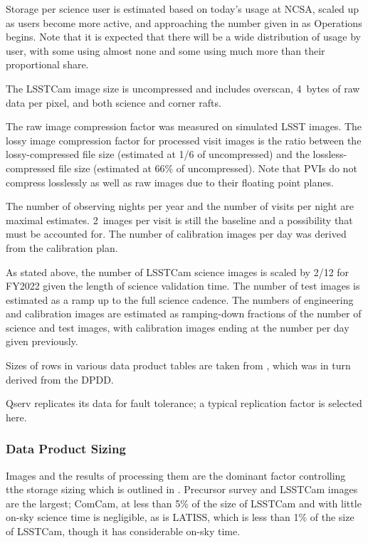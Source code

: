 Storage per science user is estimated based on today's usage at NCSA, scaled up as users become more active, and approaching the number given in  as Operations begins.
Note that it is expected that there will be a wide distribution of usage by user, with some using almost none and some using much more than their proportional share.

The LSSTCam image size is uncompressed and includes overscan, 4~bytes of raw data per pixel, and both science and corner rafts.

The raw image compression factor was measured on simulated LSST images.
The lossy image compression factor for processed visit images is the ratio between the lossy-compressed file size (estimated at 1/6 of uncompressed) and the lossless-compressed file size (estimated at 66\% of uncompressed).
Note that PVIs do not compress losslessly as well as raw images due to their floating point planes.

The number of observing nights per year and the number of visits per night are maximal estimates.
2~images per visit is still the baseline and a possibility that must be accounted for.
The number of calibration images per day was derived from the calibration plan.

As stated above, the number of LSSTCam science images is scaled by 2/12 for FY2022 given the length of science validation time.
The number of test images is estimated as a ramp up to the full science cadence.
The numbers of engineering and calibration images are estimated as ramping-down fractions of the number of science and test images, with calibration images ending at the number per day given previously.

Sizes of rows in various data product tables are taken from , which was in turn derived from the DPDD.

Qserv replicates its data for fault tolerance; a typical replication factor is selected here.

\subsubsection{Data Product Sizing}

Images and the results of processing them are the dominant factor controlling tthe storage sizing which is outlined in .
Precursor survey and LSSTCam images are the largest; ComCam, at less than 5\% of the size of LSSTCam and with little on-sky science time is negligible, as is LATISS, which is less than 1\% of the size of LSSTCam, though it has considerable on-sky time.

